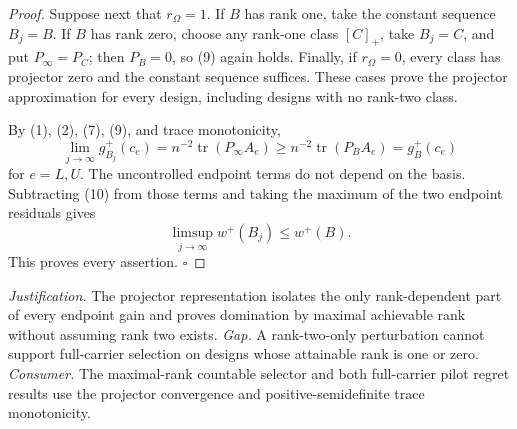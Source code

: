 \documentclass{article}
\begin{document}
\begin{proof}
Suppose next that \(r_\Omega=1\).  If \(B\) has rank one, take the constant sequence \(B_j=B\).  If \(B\) has rank zero, choose any rank-one class \([C]_+\), take \(B_j=C\), and put \(P_\infty=P_C\); then \(P_B=0\), so (9) again holds.  Finally, if \(r_\Omega=0\), every class has projector zero and the constant sequence suffices.  These cases prove the projector approximation for every design, including designs with no rank-two class.

By (1), (2), (7), (9), and trace monotonicity,
\[
\lim_{j\to\infty}g_{B_j}^+(c_e)
=n^{-2}\operatorname{tr}(P_\infty A_e)
\ge n^{-2}\operatorname{tr}(P_BA_e)
=g_B^+(c_e)
\tag{10}
\]
for \(e=L,U\).  The uncontrolled endpoint terms do not depend on the basis.  Subtracting (10) from those terms and taking the maximum of the two endpoint residuals gives
\[
\limsup_{j\to\infty}w^+(B_j)\le w^+(B).
\tag{11}
\]
This proves every assertion. \(\square\)
\end{proof}
\par\smallskip\noindent \textit{Justification.} The projector representation isolates the only rank-dependent part of every endpoint gain and proves domination by maximal achievable rank without assuming rank two exists. \textit{Gap.} A rank-two-only perturbation cannot support full-carrier selection on designs whose attainable rank is one or zero. \textit{Consumer.} The maximal-rank countable selector and both full-carrier pilot regret results use the projector convergence and positive-semidefinite trace monotonicity.
\end{document}
